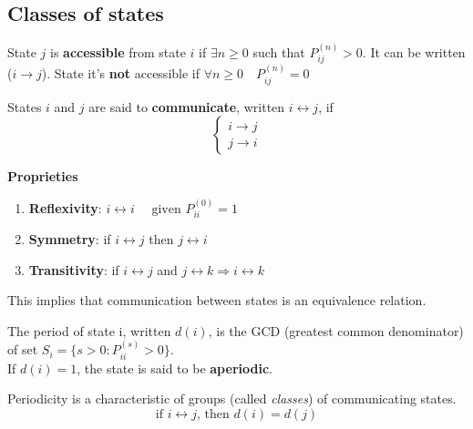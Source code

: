 \subsection{Classes of states}
	\begin{definition}
		State $j$ is {\bfseries accessible} from state $i$ if $\exists n \geq 0$ such that $P_{ij}^{(n)} > 0$. It can be written ($i \rightarrow j$).
		State it's \textbf{not} accessible if $\forall n \ge 0 \quad P_{ij}^{(n)}=0$
	\end{definition}

	\begin{definition}
		States $i$ and $j$ are said to {\bfseries communicate}, written $ i \leftrightarrow j$, if
		$$\begin{cases}
			i \rightarrow j \\
			j \rightarrow i
		\end{cases}$$
	\end{definition}

	{\bfseries Proprieties}
	\begin{enumerate}
		\item \textbf{Reflexivity}: \quad $i \leftrightarrow i \quad\text{ given } P_{ii}^{(0)}=1$
		\item \textbf{Symmetry}: \quad if $i \leftrightarrow j$ then $j \leftrightarrow i$
		\item \textbf{Transitivity}: \quad if $i \leftrightarrow j$ and $j \leftrightarrow k \Rightarrow i \leftrightarrow k$
	\end{enumerate}
	This implies that communication between states is an equivalence relation.

	\begin{definition}[Periodicity]
		The period of state i, written $d(i)$, is the GCD (greatest common denominator) of set $S_i = \{ s>0 : P_{ii}^{(s)} >0 \}$.\\
		If $d(i)=1$, the state is said to be \textbf{aperiodic}.
	\end{definition}

	\begin{theorem}[Periodicity] Periodicity is a characteristic of groups (called \emph{classes}) of communicating states.
		$$\text{if } i \leftrightarrow j \text{, then } d(i) = d(j)$$
	\end{theorem}

